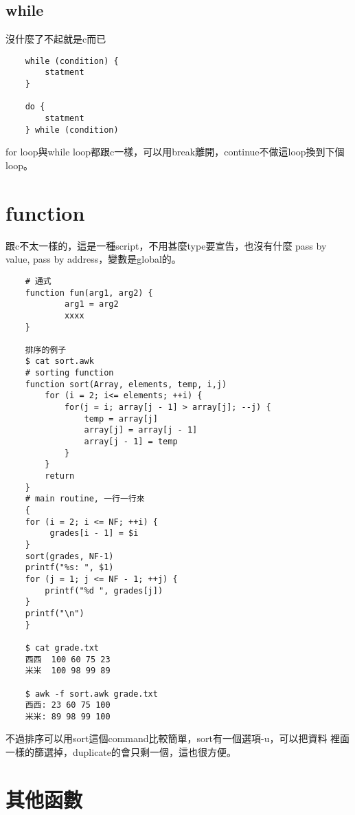     \subsection{while}
    沒什麼了不起就是c而已
    \begin{verbatim}
    while (condition) {
        statment
    }

    do {
        statment
    } while (condition)

    \end{verbatim}
    for loop與while loop都跟c一樣，可以用break離開，continue不做這loop換到下個
    loop。

    \section{function}
    跟c不太一樣的，這是一種script，不用甚麼type要宣告，也沒有什麼
    pass by value, pass by address，變數是global的。
    \begin{verbatim}
    # 通式
    function fun(arg1, arg2) {
            arg1 = arg2
            xxxx
    }

    排序的例子
    $ cat sort.awk
    # sorting function
    function sort(Array, elements, temp, i,j)
        for (i = 2; i<= elements; ++i) {
            for(j = i; array[j - 1] > array[j]; --j) {
                temp = array[j]
                array[j] = array[j - 1]
                array[j - 1] = temp
            }
        }
        return 
    }
    # main routine, 一行一行來
    {
    for (i = 2; i <= NF; ++i) {
         grades[i - 1] = $i
    }
    sort(grades, NF-1)
    printf("%s: ", $1)
    for (j = 1; j <= NF - 1; ++j) {
        printf("%d ", grades[j])
    }
    printf("\n")
    }

    $ cat grade.txt
    西西  100 60 75 23
    米米  100 98 99 89

    $ awk -f sort.awk grade.txt
    西西: 23 60 75 100 
    米米: 89 98 99 100

    \end{verbatim}
    不過排序可以用sort這個command比較簡單，sort有一個選項-u，可以把資料
    裡面一樣的篩選掉，duplicate的會只剩一個，這也很方便。
    
    \section{其他函數}
